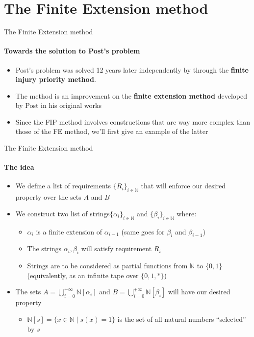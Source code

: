 \documentclass{beamer}
\newcommand{\N}{\mathbb{N}}
\newcommand{\curlyquotes}[1]{\textquotedblleft #1\textquotedblright}
\begin{document}
\section{The Finite Extension method}

\begin{frame}{The Finite Extension method}
\framesubtitle{Towards the solution to Post's problem}
    \begin{itemize}[<+->]
        \item Post's problem was solved 12 years later independently by \textcite{friedberg, muchnik} through the \textbf{finite injury priority method}.
        \item The method is an improvement on the \textbf{finite extension method} developed by Post in his original works
        \item Since the FIP method involves constructions that are way more complex than those of the FE method, we'll first give an example of the latter
    \end{itemize}
\end{frame}

\begin{frame}{The Finite Extension method}
\framesubtitle{The idea}

    \begin{itemize}[<+->]

        \item We define a list of requirements $\{R_i\}_{i \in \N}$ that will enforce our desired property over the sets $A$ and $B$
        
        \item We construct two list of strings$\{\alpha_i\}_{i \in \N}$ and $\{\beta_i\}_{i \in \N}$ where:
        \begin{itemize}
            \item $\alpha_i$ is a finite extension of $\alpha_{i-1}$ (same goes for $\beta_i$ and $\beta_{i-1}$)
            \item The strings $\alpha_i, \beta_i$ will satisfy requirement $R_i$
            \item Strings are to be considered as partial functions from $\N$ to $\{0,1\}$ (equivalently, as an infinite tape over $\{0,1,*\}$)
        \end{itemize}

        \item The sets $A = \bigcup_{i = 0}^{+\infty}\N[\alpha_i]$ and $B = \bigcup_{i = 0}^{+\infty}\N[\beta_i]$ will have our desired property
        \begin{itemize}
            \item $\N[s] = \{x \in \N \mid s(x) = 1\}$ is the set of all natural numbers \curlyquotes{selected} by $s$
        \end{itemize}
        
    \end{itemize}
\end{frame}
\end{document}

